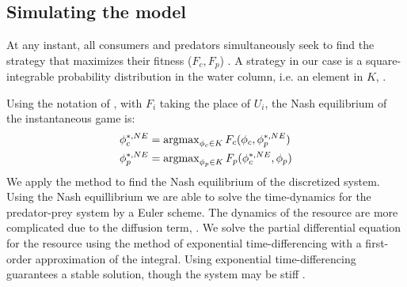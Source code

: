 \subsection{Simulating the model}




At any instant, all consumers and predators simultaneously seek to find the strategy that maximizes their fitness ($F_c, F_p$) . A strategy in our case is a square-integrable probability distribution in the water column, i.e. an element in $K$, .

Using the notation of , with $F_i$ taking the place of $U_i$, the Nash equilibrium of the instantaneous game is:
\begin{align}
  \label{eq:nash_equilibria}
	\phi_c^{*,NE} &=  \argmax_{\phi_c \in K}  F_c(\phi_c, \phi_p^{*,NE}) \\
	\phi_p^{*,NE} &=  \argmax_{\phi_p \in K} F_p(\phi_c^{*,NE}, \phi_p)
\end{align}
We apply the method  to find the Nash equilibrium of the discretized system. Using the Nash equillibrium  we are able to solve the time-dynamics for the predator-prey system  by a Euler scheme. The dynamics of the resource are more complicated due to the diffusion term, . We solve the partial differential equation for the resource using the method of exponential time-differencing \citep{hochbruck2010exponential} with a first-order approximation of the integral. Using exponential time-differencing guarantees a stable solution, though the system may be stiff \cite{hochbruck2010exponential}.

